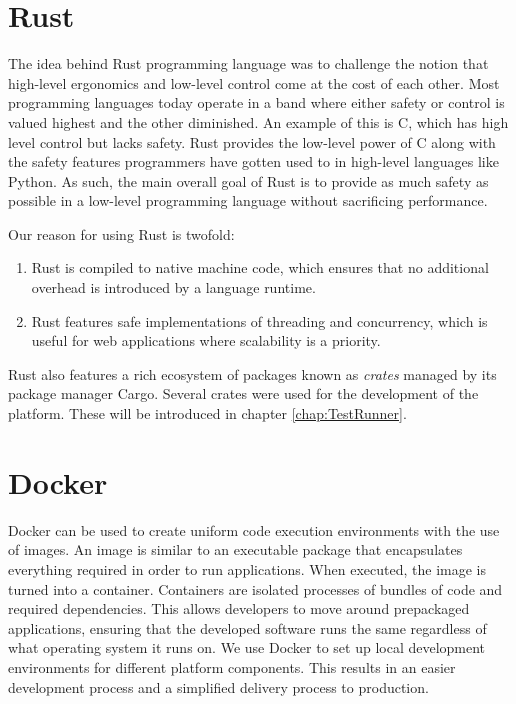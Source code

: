\section{Rust}
The idea behind Rust programming language was to challenge the notion that high-level ergonomics and low-level control come at the cost of each other\cite{Rust_Book}.
Most programming languages today operate in a band where either safety or control is valued highest and the other diminished. An example of this is C, which has high level control but lacks safety.
Rust provides the low-level power of C along with the safety features programmers have gotten used to in high-level languages like Python.
As such, the main overall goal of Rust is to provide as much safety as possible in a low-level programming language without sacrificing performance. \cite{Rust_in_Action}

Our reason for using Rust is twofold:
\begin{enumerate}
    \item Rust is compiled to native machine code, which ensures that no additional overhead is introduced by a language runtime.
    \item Rust features safe implementations of threading and concurrency, which is useful for web applications where scalability is a priority.
\end{enumerate}

Rust also features a rich ecosystem of packages known as \textit{crates} managed by its package manager Cargo\cite{Cargo}. Several crates were used for the development of the platform. These will be introduced in chapter \ref{chap:TestRunner}.

\section{Docker}
Docker can be used to create uniform code execution environments with the use of images\cite{Docker_Container}.
An image is similar to an executable package that encapsulates everything required in order to run applications. 
When executed, the image is turned into a container.
Containers are isolated processes of bundles of code and required dependencies. 
This allows developers to move around prepackaged applications, ensuring that the developed software runs the same regardless of what operating system it runs on\cite{Docker_Container}.
We use Docker to set up local development environments for different platform components. This results in an easier development process and a simplified delivery process to production.


